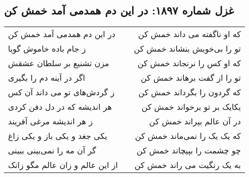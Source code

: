 \begin{center}
\section*{غزل شماره ۱۸۹۷: در این دم همدمی آمد خمش کن}
\label{sec:1897}
\begin{longtable}{l p{0.5cm} r}
در این دم همدمی آمد خمش کن
&&
که او ناگفته می داند خمش کن
\\
ز جام باده خاموش گویا
&&
تو را بی‌خویش بنشاند خمش کن
\\
مزن تشنیع بر سلطان عشقش
&&
که او کس را نرنجاند خمش کن
\\
اگر در آینه دم را بگیری
&&
تو را از گفت برهاند خمش کن
\\
ز گردش‌های تو می داند آن کس
&&
که گردون را بگرداند خمش کن
\\
هر اندیشه که در دل دفن کردی
&&
یکایک بر تو برخواند خمش کن
\\
ز هر اندیشه مرغی آفریند
&&
در آن عالم بپراند خمش کن
\\
یکی جغد و یکی باز و یکی زاغ
&&
که یک یک را نمی‌ماند خمش کن
\\
گر آن مه را نمی‌بینی ببینی
&&
چو چشمت را بپیچاند خمش کن
\\
از این عالم و زان عالم مگو زانک
&&
به یک رنگیت می راند خمش کن
\\
\end{longtable}
\end{center}
